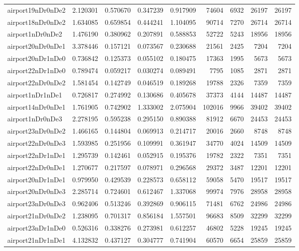 \begin{longtable}{|l|r|r|r|r|r|r|r|r|}
airport19nDr0nDe2 & 2.120301 & 0.570670 & 0.347239 & 0.917909 & 74604 & 6932 & 26197 & 26197 \\
airport18nDr0nDe2 & 1.634085 & 0.659854 & 0.444241 & 1.104095 & 90714 & 7270 & 26714 & 26714 \\
airport1nDr0nDe2 & 1.476190 & 0.380962 & 0.207891 & 0.588853 & 52722 & 5243 & 18956 & 18956 \\
airport20nDr0nDe1 & 3.378446 & 0.157121 & 0.073567 & 0.230688 & 21561 & 2425 & 7204 & 7204 \\
airport20nDr1nDe0 & 0.736842 & 0.125373 & 0.055102 & 0.180475 & 17363 & 1995 & 5673 & 5673 \\
airport22nDr1nDe0 & 0.789474 & 0.059217 & 0.030274 & 0.089491 & 7795 & 1085 & 2871 & 2871 \\
airport22nDr0nDe2 & 1.581454 & 0.142749 & 0.046519 & 0.189268 & 19788 & 2326 & 7359 & 7359 \\
airport1nDr1nDe1 & 0.726817 & 0.274992 & 0.130686 & 0.405678 & 37373 & 4144 & 14487 & 14487 \\
airport14nDr0nDe1 & 1.761905 & 0.742902 & 1.333002 & 2.075904 & 102016 & 9966 & 39402 & 39402 \\
airport1nDr0nDe3 & 2.278195 & 0.595238 & 0.295150 & 0.890388 & 81912 & 6670 & 24453 & 24453 \\
airport23nDr0nDe2 & 1.466165 & 0.144804 & 0.069913 & 0.214717 & 20016 & 2660 & 8748 & 8748 \\
airport22nDr0nDe3 & 1.593985 & 0.251956 & 0.109991 & 0.361947 & 34770 & 4024 & 14509 & 14509 \\
airport22nDr1nDe1 & 1.295739 & 0.142461 & 0.052915 & 0.195376 & 19782 & 2322 & 7351 & 7351 \\
airport22nDr0nDe1 & 1.270677 & 0.217597 & 0.078971 & 0.296568 & 29372 & 3487 & 12201 & 12201 \\
airport20nDr1nDe1 & 0.979950 & 0.429539 & 0.228573 & 0.658112 & 59058 & 5470 & 19517 & 19517 \\
airport20nDr0nDe3 & 2.285714 & 0.724601 & 0.612467 & 1.337068 & 99974 & 7976 & 28958 & 28958 \\
airport23nDr0nDe3 & 0.962406 & 0.513246 & 0.392869 & 0.906115 & 71481 & 6762 & 24986 & 24986 \\
airport21nDr0nDe2 & 1.238095 & 0.701317 & 0.856184 & 1.557501 & 96683 & 8509 & 32299 & 32299 \\
airport23nDr1nDe0 & 0.526316 & 0.338276 & 0.273981 & 0.612257 & 46802 & 5228 & 19245 & 19245 \\
airport21nDr1nDe1 & 4.132832 & 0.437127 & 0.304777 & 0.741904 & 60570 & 6654 & 25859 & 25859 \\

\end{longtable}
